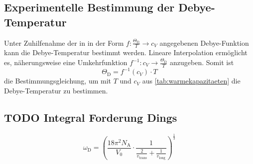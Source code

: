 \subsection{Experimentelle Bestimmung der Debye-Temperatur}
Unter Zuhilfenahme der in \cite[Tabelle 1]{versuchsanleitung}
in der Form $f: \frac{\Theta_\text{D}}{T} \longrightarrow c_V$
angegebenen Debye-Funktion
kann die Debye-Temperatur bestimmt werden.
Lineare Interpolation ermöglicht es, näherungsweise eine Umkehrfunktion
$f^{-1}: c_V \longrightarrow \frac{\Theta_\text{D}}{T}$
anzugeben.
Somit ist
\[
    \Theta_\text{D} = f^{-1}(c_V) · T
\]
die Bestimmungsgleichung, um mit $T$ und $c_V$ aus \autoref{tab:warmekapazitaeten} die Debye-Temperatur zu bestimmen.


\subsection{TODO Integral Forderung Dings}
\begin{equation*}
    \omega_\text{D}
    = \left(
        \frac{18 \pi^2 N_\text{A}}{V_0} · \frac{1}{\frac{2}{v_\text{trans}} + \frac{1}{v_\text{long}}}
    \right)^{\frac{1}{3}}
\end{equation*}
